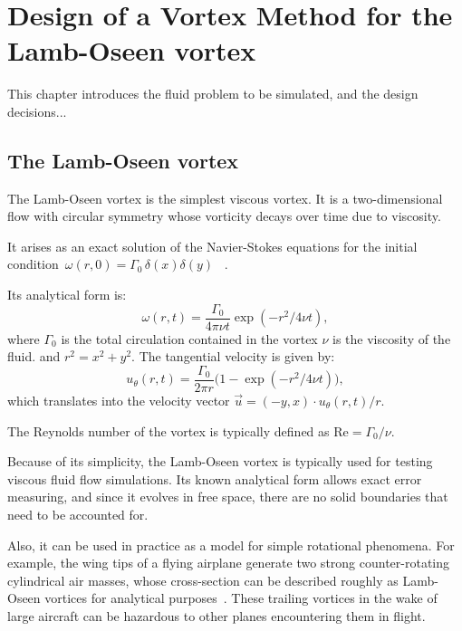 \chapter{Design of a Vortex Method for the Lamb-Oseen vortex}
\label{ch:vm-design}


This chapter introduces the fluid problem to be simulated,
and the design decisions...

\section{The Lamb-Oseen vortex}
\label{sec:lamb-oseen-vortex}

The Lamb-Oseen vortex is the simplest viscous vortex.
It is a two-dimensional flow with circular symmetry
whose vorticity decays over time due to viscosity.

It arises as an exact solution of the Navier-Stokes equations
for the initial condition~\(ω(r, 0) = Γ_0\,δ(x) δ(y)\)%
~\cite[\S13.1]{saffman95}.

Its analytical form is:
\begin{equation}
  \label{eq:lamb-oseen-vorticity}
  ω(r, t) = \frac{Γ_0}{4πνt} \exp(-r^2/4νt),
\end{equation}
where \(Γ_0\) is the total circulation contained in the vortex
\(ν\) is the viscosity of the fluid.
and \(r^2 = x^2 + y^2\).
The tangential velocity is given by:
\begin{equation}
  \label{eq:lamb-oseen-tangential-velocity}
  u_\theta(r, t) = \frac{Γ_0}{2πr} \bigl(1 - \exp(-r^2/4νt)\bigr),
\end{equation}
which translates into the velocity vector
\(\vec{u} = (-y, x)\cdot u_\theta(r, t)/r \).


The Reynolds number of the vortex
is typically defined as \(\text{Re} = Γ_0/ν\).

Because of its simplicity,
the Lamb-Oseen vortex is typically used
for testing viscous fluid flow simulations.
Its known analytical form allows exact error measuring,
and since it evolves in free space,
there are no solid boundaries that need to be accounted for.

Also, it can be used in practice
as a model for simple rotational phenomena.
For example,
the wing tips of a flying airplane
generate two strong counter-rotating cylindrical air masses,
whose cross-section can be described roughly as Lamb-Oseen vortices
for analytical purposes~\cite{mcgowan71}.
These trailing vortices in the wake of large aircraft
can be hazardous to other planes encountering them in flight.

